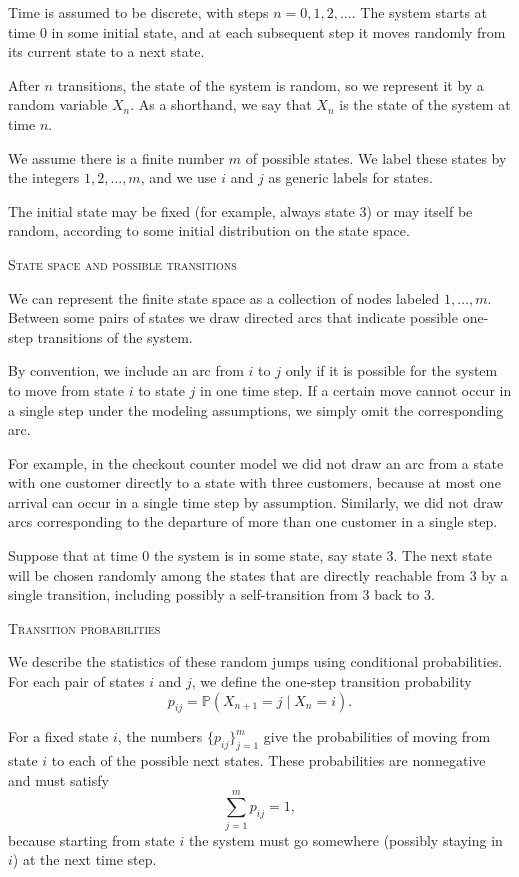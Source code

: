 Time is assumed to be discrete, with steps \(n = 0,1,2,\dots\).
The system starts at time \(0\) in some initial state, and at each subsequent step it moves randomly from its current state to a next state.

After \(n\) transitions, the state of the system is random, so we represent it by a random variable \(X_n\).
As a shorthand, we say that \(X_n\) is the state of the system at time \(n\).

We assume there is a finite number \(m\) of possible states.
We label these states by the integers \(1,2,\dots,m\), and we use \(i\) and \(j\) as generic labels for states.

The initial state may be fixed (for example, always state \(3\)) or may itself be random, according to some initial distribution on the state space.

\bigskip
\textsc{State space and possible transitions}

We can represent the finite state space as a collection of nodes labeled \(1,\dots,m\).
Between some pairs of states we draw directed arcs that indicate possible one-step transitions of the system.

By convention, we include an arc from \(i\) to \(j\) only if it is possible for the system to move from state \(i\) to state \(j\) in one time step.
If a certain move cannot occur in a single step under the modeling assumptions, we simply omit the corresponding arc.

For example, in the checkout counter model we did not draw an arc from a state with one customer directly to a state with three customers, because at most one arrival can occur in a single time step by assumption.
Similarly, we did not draw arcs corresponding to the departure of more than one customer in a single step.

Suppose that at time \(0\) the system is in some state, say state \(3\).
The next state will be chosen randomly among the states that are directly reachable from \(3\) by a single transition, including possibly a self-transition from \(3\) back to \(3\).

\bigskip
\textsc{Transition probabilities}

We describe the statistics of these random jumps using conditional probabilities.
For each pair of states \(i\) and \(j\), we define the one-step transition probability
\[
p_{ij}
=
\mathbb{P}(X_{n+1} = j \mid X_n = i).
\]

For a fixed state \(i\), the numbers \(\{p_{ij}\}_{j=1}^{m}\) give the probabilities of moving from state \(i\) to each of the possible next states.
These probabilities are nonnegative and must satisfy
\[
\sum_{j=1}^{m} p_{ij}
=
1,
\]
because starting from state \(i\) the system must go somewhere (possibly staying in \(i\)) at the next time step.


